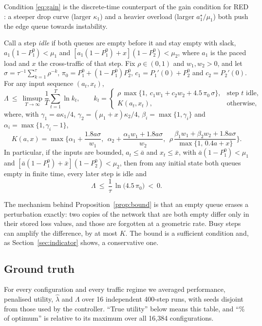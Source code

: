 Condition \eqref{eq:gain} is the discrete-time counterpart of the gain condition for RED \citep{ranjan2004nonlinear}: a steeper drop curve (larger $\kappa_1$) and a heavier overload (larger $a_1^\star/\mu_1$) both push the edge queue towards instability.

\begin{proposition}\label{prop:bound}
Call a step \emph{idle} if both queues are empty before it and stay empty with slack, $a_1(1-P_1^0)<\mu_1$ and $[a_1(1-P_1^0)+x](1-P_2^0)<\mu_2$, where $a_1$ is the paced load and $x$ the cross-traffic of that step. Fix $\rho\in(0,1)$ and $w_1,w_2>0$, and let $\sigma=\tau^{-1}\sum_{k=1}^{\tau}\rho^{-k}$, $\pi_0=P_1^0+(1-P_1^0)P_2^0$, $c_1=P_1'(0)+P_2^0$ and $c_2=P_2'(0)$. For any input sequence $(a_t,x_t)$,
\begin{equation}
\Lambda\ \le\ \limsup_{T\to\infty}\frac1T\sum_{t=1}^{T}\ln k_t,
\qquad
k_t=\begin{cases}
\rho\,\max\{1,\ c_1w_1+c_2w_2+4.5\,\pi_0\,\sigma\}, & \text{step $t$ idle},\\[2pt]
K(a_t,x_t), & \text{otherwise},
\end{cases}
\label{eq:bound}
\end{equation}
where, with $\gamma_1=a\kappa_1/4$, $\gamma_2=(\mu_1+x)\kappa_2/4$, $\beta_i=\max\{1,\gamma_i\}$ and $\alpha_i=\max\{1,\gamma_i-1\}$,
\[
K(a,x)=\max\Big\{\alpha_1+\frac{1.8a\sigma}{w_1},\ \ \alpha_2+\frac{\alpha_1w_1+1.8a\sigma}{w_2},\ \ \rho\,\frac{\beta_1w_1+\beta_2w_2+1.8a\sigma}{\max\{1,\,0.4a+x\}}\Big\}.
\]
In particular, if the inputs are bounded, $a_t\le\bar a$ and $x_t\le\bar x$, with $\bar a(1-P_1^0)<\mu_1$ and $[\bar a(1-P_1^0)+\bar x](1-P_2^0)<\mu_2$, then from any initial state both queues empty in finite time, every later step is idle and
\begin{equation}
\Lambda\ \le\ \frac{1}{\tau}\,\ln\big(4.5\,\pi_0\big)\ <\ 0 .
\label{eq:underload}
\end{equation}
\end{proposition}

The mechanism behind Proposition~\ref{prop:bound} is that an empty queue erases a perturbation exactly: two copies of the network that are both empty differ only in their stored loss values, and those are forgotten at a geometric rate. Busy steps can amplify the difference, by at most $K$. The bound is a sufficient condition and, as Section~\ref{sec:indicator} shows, a conservative one.

\subsection{Ground truth}
For every configuration and every traffic regime we averaged performance, penalised utility, $\hat\lambda$ and $\Lambda$ over 16 independent 400-step runs, with seeds disjoint from those used by the controller. ``True utility'' below means this table, and ``\% of optimum'' is relative to its maximum over all 16,384 configurations.

